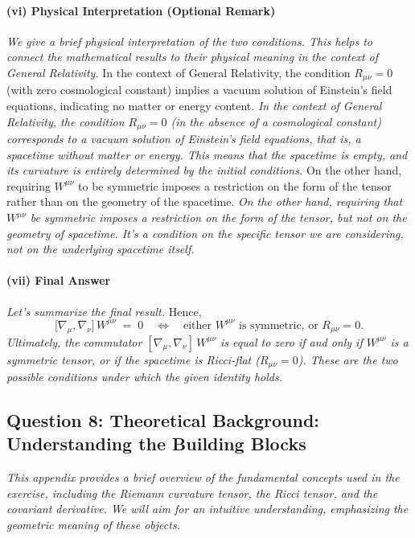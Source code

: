 \paragraph{(vi) Physical Interpretation (Optional Remark)}
\textit{We give a brief physical interpretation of the two conditions. This helps to connect the mathematical results to their physical meaning in the context of General Relativity.}
In the context of General Relativity, the condition $R_{\mu\nu}=0$ (with zero cosmological constant) implies a vacuum solution of Einstein's field equations, indicating no matter or energy content.
\textit{In the context of General Relativity, the condition \(R_{\mu\nu}=0\) (in the absence of a cosmological constant) corresponds to a vacuum solution of Einstein's field equations, that is, a spacetime without matter or energy. This means that the spacetime is empty, and its curvature is entirely determined by the initial conditions.}
On the other hand, requiring $W^{\mu\nu}$ to be symmetric imposes a restriction on the form of the tensor rather than on the geometry of the spacetime.
\textit{On the other hand, requiring that \(W^{\mu\nu}\) be symmetric imposes a restriction on the form of the tensor, but not on the geometry of spacetime. It's a condition on the specific tensor we are considering, not on the underlying spacetime itself.}

\paragraph{(vii) Final Answer}
\textit{Let's summarize the final result.}
Hence,
\[
\bigl[\nabla_{\mu}, \nabla_{\nu}\bigr]\,W^{\mu\nu}
\;=\;0
\quad
\Longleftrightarrow
\quad
\text{either }W^{\mu\nu}\text{ is symmetric, or }R_{\mu\nu}=0.
\]
\textit{Ultimately, the commutator \([\nabla_{\mu}, \nabla_{\nu}]\,W^{\mu\nu}\) is equal to zero if and only if \(W^{\mu\nu}\) is a symmetric tensor, or if the spacetime is Ricci-flat (\(R_{\mu\nu}=0\)). These are the two possible conditions under which the given identity holds.}

\subsection*{Question 8: Theoretical Background: Understanding the Building Blocks}

\textit{This appendix provides a brief overview of the fundamental concepts used in the exercise, including the Riemann curvature tensor, the Ricci tensor, and the covariant derivative. We will aim for an intuitive understanding, emphasizing the geometric meaning of these objects.}

